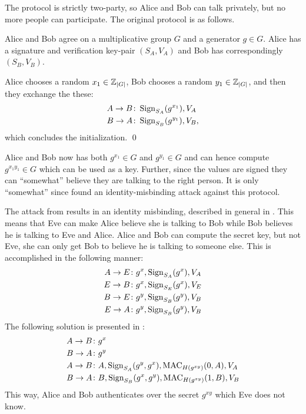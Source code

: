 The protocol is strictly two-party, so Alice and Bob can talk privately, but no 
more people can participate.
The original protocol \cite{otr2004} is as follows.

\begin{protocol}\label{proto:otr1init}
  Alice and Bob agree on a multiplicative group \(G\) and a generator \(g\in 
  G\).
  Alice has a signature and verification key-pair \((S_A, V_A)\) and Bob has 
  correspondingly \((S_B, V_B)\).

  Alice chooses a random \(x_1\in \operatorname{\mathbb Z}_{|G|}\),
  Bob chooses a random \(y_1\in \operatorname{\mathbb Z}_{|G|}\),
  and then they exchange the these:
  \begin{align*}
    A\to B&\colon \operatorname{\mathrm{Sign}}_{S_A}( g^{x_1} ), V_A \\
    B\to A&\colon \operatorname{\mathrm{Sign}}_{S_B}( g^{y_1} ), V_B,
  \end{align*}
  which concludes the initialization.
  \qed
\end{protocol}

Alice and Bob now has both \(g^{x_1}\in G\) and \(g^{y_1}\in G\) and can hence 
compute \(g^{x_1 y_1}\in G\) which can be used as a key.
Further, since the values are signed they can \enquote{somewhat} believe they 
are talking to the right person.
It is only \enquote{somewhat} since \citeauthor{di2005secure} 
\cite{di2005secure} found an identity-misbinding attack against this protocol.  

The attack from \cite{di2005secure} results in an identity misbinding, 
described in general in \cite{ake}.
This means that Eve can make Alice believe she is talking to Bob while Bob 
believes he is talking to Eve and Alice.
Alice and Bob can compute the secret key, but not Eve, she can only get Bob to 
believe he is talking to someone else.
This is accomplished in the following manner:
\begin{align*}
  A\to E &\colon g^x, \operatorname{\mathrm{Sign}}_{S_A}( g^x ), V_A \\
  E\to B &\colon g^x, \operatorname{\mathrm{Sign}}_{S_E}( g^x ), V_E \\
  B\to E &\colon g^y, \operatorname{\mathrm{Sign}}_{S_B}( g^y ), V_B \\
  E\to A &\colon g^y, \operatorname{\mathrm{Sign}}_{S_B}( g^y ), V_B \\
\end{align*}
The following solution is presented in \cite{di2005secure}:
\begin{align*}
  A\to B &\colon g^{x} \\
  B\to A &\colon g^{y} \\
  A\to B &\colon A,
    \operatorname{\mathrm{Sign}}_{S_A}( g^{y}, g^{x} ),
    \operatorname{\mathrm{MAC}}_{H( g^{x y} )}( 0, A ),
    V_A \\
  B\to A &\colon B,
    \operatorname{\mathrm{Sign}}_{S_B}( g^{x}, g^{y} ),
    \operatorname{\mathrm{MAC}}_{H( g^{x y} )}( 1, B ),
    V_B \\
\end{align*}
This way, Alice and Bob authenticates over the secret \(g^{xy}\) which Eve does 
not know.

